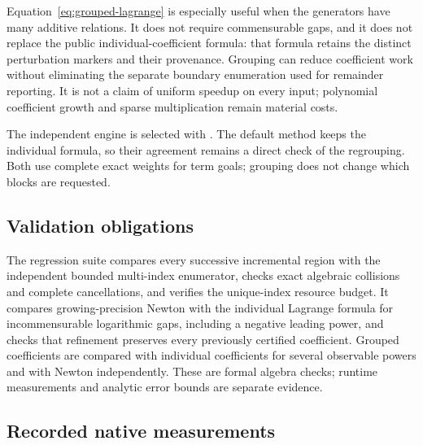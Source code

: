 Equation~\eqref{eq:grouped-lagrange} is especially useful when the generators
have many additive relations. It does not require commensurable gaps, and it
does not replace the public individual-coefficient formula: that formula
retains the distinct perturbation markers and their provenance. Grouping can
reduce coefficient work without eliminating the separate boundary enumeration
used for remainder reporting. It is not a claim of uniform speedup on every
input; polynomial coefficient growth and sparse multiplication remain material
costs.

The independent engine is selected with .
The default  method keeps the individual formula, so their
agreement remains a direct check of the regrouping. Both use complete exact
weights for term goals; grouping does not change which blocks are requested.

\subsection{Validation obligations}

The regression suite compares every successive incremental region with the
independent bounded multi-index enumerator, checks exact algebraic collisions
and complete cancellations, and verifies the unique-index resource budget.
It compares growing-precision Newton with the individual Lagrange formula for
incommensurable logarithmic gaps, including a negative leading power, and
checks that refinement preserves every previously certified coefficient.
Grouped coefficients are compared with individual coefficients for several
observable powers and with Newton independently. These are formal algebra
checks; runtime measurements and analytic error bounds are separate evidence.

\subsection{Recorded native measurements}

